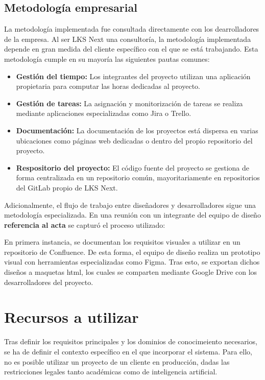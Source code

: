 \subsection{Metodología empresarial}
La metodología implementada fue consultada directamente con los dearrolladores de la empresa. Al ser LKS Next una consultoría, la metodología implementada depende en gran medida del cliente específico con el que se está trabajando. Esta metodología cumple en su mayoría las siguientes pautas comunes:
\begin{itemize}
  \item\textbf{Gestión del tiempo: }Los integrantes del proyecto utilizan una aplicación propietaria para computar las horas dedicadas al proyecto.
  \item\textbf{Gestión de tareas: }La asignación y monitorización de tareas se realiza mediante aplicaciones especializadas como Jira o Trello.
  \item\textbf{Documentación: }La documentación de los proyectos está dispersa en varias ubicaciones como páginas web dedicadas o dentro del propio repositorio del proyecto.
  \item\textbf{Respositorio del proyecto: }El código fuente del proyecto se gestiona de forma centralizada en un repositorio común, mayoritariamente en repositorios del GitLab propio de LKS Next.
\end{itemize}

Adicionalmente, el flujo de trabajo entre diseñadores y desarrolladores sigue una metodología especializada. En una reunión con un integrante del equipo de diseño \textbf{referencia al acta} se capturó el proceso utilizado:

En primera instancia, se documentan los requisitos visuales a utilizar en un repositorio de Confluence. De esta forma, el equipo de diseño realiza un prototipo visual con herramientas especializadas como Figma. Tras esto, se exportan dichos diseños a maquetas html, los cuales se comparten mediante Google Drive con los desarrolladores del proyecto.

\section{Recursos a utilizar}
Tras definir los requisitos principales y los dominios de conocimeiento necesarios, se ha de definir el contexto específico en el que incorporar el sistema.  Para ello, no es posible utilizar un proyecto de un cliente en producción, dadas las restricciones legales tanto académicas como de inteligencia artificial.

